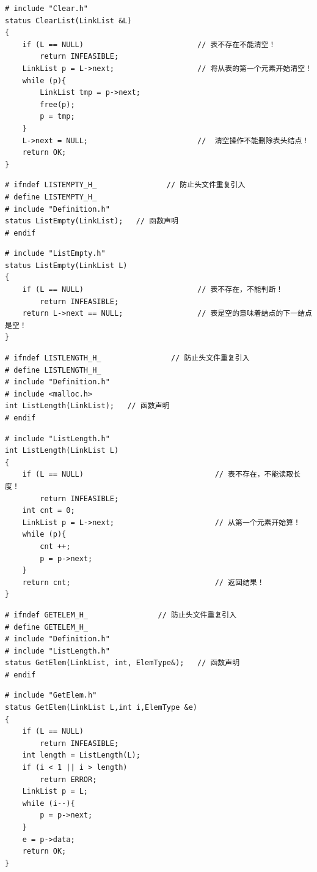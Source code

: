 \documentclass[supercite]{Experimental_Report}
\theoremstyle{definition}
\begin{document}
\begin{lstlisting}[title = Clear.cpp]
# include "Clear.h"
status ClearList(LinkList &L)
{
    if (L == NULL)                          // 表不存在不能清空！
        return INFEASIBLE;   
    LinkList p = L->next;                   // 将从表的第一个元素开始清空！
    while (p){
        LinkList tmp = p->next;
        free(p);
        p = tmp;
    }
    L->next = NULL;                         //  清空操作不能删除表头结点！
    return OK;
}
\end{lstlisting}

\begin{lstlisting}[title = ListEmpty.h]
# ifndef LISTEMPTY_H_                // 防止头文件重复引入
# define LISTEMPTY_H_
# include "Definition.h"
status ListEmpty(LinkList);   // 函数声明
# endif
\end{lstlisting}

\begin{lstlisting}[title = ListEmpty.cpp]
# include "ListEmpty.h"
status ListEmpty(LinkList L)
{
    if (L == NULL)                          // 表不存在，不能判断！
        return INFEASIBLE;
    return L->next == NULL;                 // 表是空的意味着结点的下一结点是空！
}
\end{lstlisting}

\begin{lstlisting}[title = ListLength.h]
# ifndef LISTLENGTH_H_                // 防止头文件重复引入
# define LISTLENGTH_H_
# include "Definition.h"
# include <malloc.h>
int ListLength(LinkList);   // 函数声明
# endif
\end{lstlisting}

\begin{lstlisting}[title = ListLength.cpp]
# include "ListLength.h"
int ListLength(LinkList L)
{
    if (L == NULL)                              // 表不存在，不能读取长度！
        return INFEASIBLE;
    int cnt = 0;
    LinkList p = L->next;                       // 从第一个元素开始算！
    while (p){
        cnt ++;
        p = p->next;
    }
    return cnt;                                 // 返回结果！
}
\end{lstlisting}

\begin{lstlisting}[title = GetElem.h]
# ifndef GETELEM_H_                // 防止头文件重复引入
# define GETELEM_H_
# include "Definition.h"
# include "ListLength.h"
status GetElem(LinkList, int, ElemType&);   // 函数声明
# endif
\end{lstlisting}

\begin{lstlisting}[title = GetElem.cpp]
# include "GetElem.h"
status GetElem(LinkList L,int i,ElemType &e)
{
    if (L == NULL)
        return INFEASIBLE;
    int length = ListLength(L);
    if (i < 1 || i > length)
        return ERROR;
    LinkList p = L;
    while (i--){
        p = p->next;
    }
    e = p->data;
    return OK;
}
\end{lstlisting}
\end{document}
